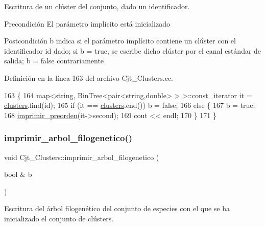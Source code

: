 Escritura de un clúster del conjunto, dado un identificador. 

\begin{DoxyPrecond}{Precondición}
El parámetro implícito está inicializado 
\end{DoxyPrecond}
\begin{DoxyPostcond}{Postcondición}
b indica si el parámetro implícito contiene un clúster con el identificador id dado; si b = true, se escribe dicho clúster por el canal estándar de salida; b = false contrariamente 
\end{DoxyPostcond}


Definición en la línea 163 del archivo Cjt\+\_\+\+Clusters.\+cc.


\begin{DoxyCode}
163                                                             \{
164   map<string, BinTree<pair<string,double> > >::const\_iterator it = \hyperlink{class_cjt___clusters_a866c5a14f8f50598be2af9fd8c115dd2}{clusters}.find(\textcolor{keywordtype}{id});
165   \textcolor{keywordflow}{if} (it == \hyperlink{class_cjt___clusters_a866c5a14f8f50598be2af9fd8c115dd2}{clusters}.end()) b = \textcolor{keyword}{false};
166   \textcolor{keywordflow}{else} \{
167     b = \textcolor{keyword}{true};
168     \hyperlink{_cjt___clusters_8cc_a4afe93558c94b1dce66fff0cf68cb08a}{imprimir\_preorden}(it->second);
169     cout << endl;
170   \}
171 \}
\end{DoxyCode}
\mbox{\label{class_cjt___clusters_a289dfd3307b383620edc1f901dced7b0}} 
\subsubsection{\texorpdfstring{imprimir\+\_\+arbol\+\_\+filogenetico()}{imprimir\_arbol\_filogenetico()}}
{\footnotesize\ttfamily void Cjt\+\_\+\+Clusters\+::imprimir\+\_\+arbol\+\_\+filogenetico (\begin{DoxyParamCaption}\item[{bool \&}]{b }\end{DoxyParamCaption})}



Escritura del árbol filogenético del conjunto de especies con el que se ha inicializado el conjunto de clústers. 

